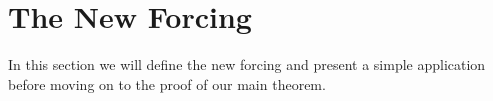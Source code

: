 \documentclass[a4paper]{amsart}
\theoremstyle{definition}
\theoremstyle{remark}
\theoremstyle{plain}
\numberwithin{mydef}{section}
\DeclareMathOperator{\Odd}{Odd}
\newcommand{\dP}{\mathbb{P}}
\newcommand{\dQ}{\mathbb{Q}}
\newcommand{\uhr}{\upharpoonright}
\begin{document}
%		
%	
	\section{The New Forcing}
	
	In this section we will define the new forcing and present a simple application before moving on to the proof of our main theorem.
	
\end{document}
